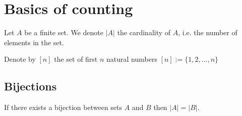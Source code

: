 \chapter{Basics of counting}
\begin{notation}
Let $A$ be a finite set. We denote $|A|$ the cardinality of $A$, i.e. the number of elements in the set.
\end{notation}
\begin{definition}
Denote by $[n]$ the set of first $n$ natural numbers $[n]:=\{ 1,2,\dots,n \}$
\end{definition}

\section{Bijections}
\begin{theorem}
If there exists a bijection between sets $A$ and $B$ then $|A|=|B|$.
\end{theorem}

